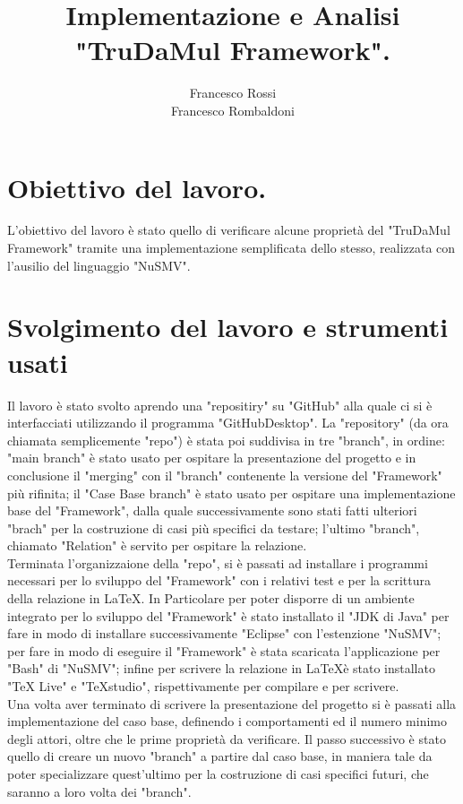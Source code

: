 \documentclass[13pt,a4paper]{article}
\title{ Implementazione  e Analisi "TruDaMul Framework".}
\author{Francesco Rossi \\
				Francesco Rombaldoni}
\date{}
\begin{document}
	\maketitle
	\newpage
	
	\newpage
	
	\section{Obiettivo del  lavoro.}
	L'obiettivo del lavoro è stato quello di verificare alcune proprietà del "TruDaMul Framework" tramite una implementazione semplificata dello stesso, realizzata con l'ausilio del linguaggio "NuSMV".\\
	
	\section{Svolgimento del lavoro e strumenti usati}
	Il lavoro è stato svolto aprendo una "repositiry" su "GitHub" alla quale ci si è interfacciati utilizzando il programma "GitHubDesktop". La "repository" (da ora chiamata semplicemente "repo") è stata poi suddivisa in tre "branch", in ordine: "main branch" è stato usato per ospitare la presentazione del progetto e in conclusione il "merging" con il "branch" contenente la versione del "Framework" più rifinita; il "Case Base branch" è stato usato per ospitare una implementazione base del "Framework", dalla quale successivamente sono stati fatti ulteriori "brach" per la costruzione di casi più specifici da testare; l'ultimo "branch", chiamato "Relation" è servito per ospitare la relazione. \bigskip \\
	Terminata l'organizzaione della "repo", si è passati ad installare i programmi necessari per lo sviluppo del "Framework" con i relativi test e per la scrittura della relazione in \LaTeX. In Particolare per poter disporre di un ambiente integrato per lo sviluppo del "Framework" è stato installato il "JDK di Java" per fare in modo di installare successivamente "Eclipse" con l'estenzione "NuSMV"; per fare in modo di eseguire il "Framework" è stata scaricata l'applicazione per "Bash" di "NuSMV"; infine per scrivere la relazione in \LaTeX è stato installato "TeX Live" e "TeXstudio", rispettivamente per compilare e per scrivere.\\
	Una volta aver terminato di scrivere la presentazione del progetto si è passati alla implementazione  del caso base, definendo i comportamenti ed il numero minimo degli attori, oltre che le prime proprietà da verificare. Il passo successivo è stato quello di creare un nuovo "branch" a partire dal caso base, in maniera tale da poter specializzare quest'ultimo per la costruzione di  casi specifici futuri, che saranno a loro volta dei "branch".\\
	 
\end{document}
